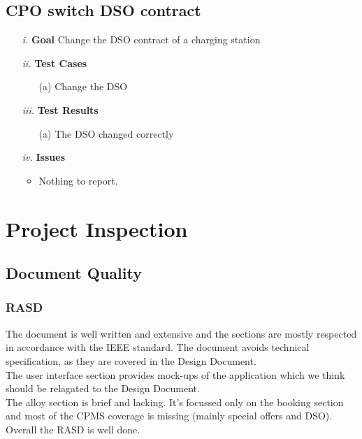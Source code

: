 \documentclass[table, 12pt]{article}
\begin{document}
\subsection{CPO switch DSO contract}
\begin{itemize}
    \item[\textit{i.}] \textbf{Goal} Change the DSO contract of a charging station
    \item[\textit{ii.}] \textbf{Test Cases}
    \begin{itemize}
        \item[(a)] Change the DSO
    \end{itemize}
    \item[\textit{iii.}] \textbf{Test Results}
    \begin{itemize}
        \item[(a)] The DSO changed correctly
    \end{itemize} 
    \item[\textit{iv.}] \textbf{Issues}    
    \begin{itemize}
        \item Nothing to report.
    \end{itemize} 
\end{itemize}




\newpage
\section{Project Inspection}

\subsection{Document Quality}
\subsubsection{RASD}
The document is well written and extensive and the sections are mostly respected in accordance with the IEEE standard. The document avoids technical specification, as they are covered in the Design Document.\\
The user interface section provides mock-ups of the application which we think should be relagated to the Design Document.\\
The alloy section is brief and lacking. It's focussed only on the booking section and most of the CPMS coverage is missing (mainly special offers and DSO).
Overall the RASD is well done.
\end{document}
